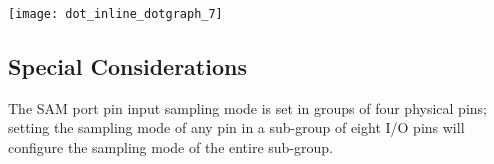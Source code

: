 \label{group__asfdoc__sam0__system__pinmux__group_asfdoc_sam0_system_pinmux_intconnections}%
%

\begin{DoxyImageNoCaption}
  \mbox{\texttt{[image: dot\_inline\_dotgraph\_7]}}
\end{DoxyImageNoCaption}
\hypertarget{group__asfdoc__sam0__system__pinmux__group_asfdoc_sam0_system_pinmux_special_considerations}{}\subsection{Special Considerations}\label{group__asfdoc__sam0__system__pinmux__group_asfdoc_sam0_system_pinmux_special_considerations}
The S\+AM port pin input sampling mode is set in groups of four physical pins; setting the sampling mode of any pin in a sub-\/group of eight I/O pins will configure the sampling mode of the entire sub-\/group.

